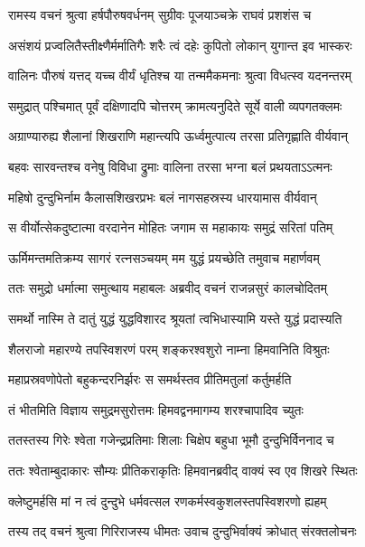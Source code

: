 
\twolineshloka
{रामस्य वचनं श्रुत्वा हर्षपौरुषवर्धनम्}
{सुग्रीवः पूजयाञ्चक्रे राघवं प्रशशंस च} %

\twolineshloka
{असंशयं प्रज्वलितैस्तीक्ष्णैर्मर्मातिगैः शरैः}
{त्वं दहेः कुपितो लोकान् युगान्त इव भास्करः} %

\twolineshloka
{वालिनः पौरुषं यत्तद् यच्च वीर्यं धृतिश्च या}
{तन्ममैकमनाः श्रुत्वा विधत्स्व यदनन्तरम्} %

\twolineshloka
{समुद्रात् पश्चिमात् पूर्वं दक्षिणादपि चोत्तरम्}
{क्रामत्यनुदिते सूर्ये वाली व्यपगतक्लमः} %

\twolineshloka
{अग्राण्यारुह्य शैलानां शिखराणि महान्त्यपि}
{ऊर्ध्वमुत्पात्य तरसा प्रतिगृह्णाति वीर्यवान्} %

\twolineshloka
{बहवः सारवन्तश्च वनेषु विविधा द्रुमाः}
{वालिना तरसा भग्ना बलं प्रथयताऽऽत्मनः} %

\twolineshloka
{महिषो दुन्दुभिर्नाम कैलासशिखरप्रभः}
{बलं नागसहस्रस्य धारयामास वीर्यवान्} %

\twolineshloka
{स वीर्योत्सेकदुष्टात्मा वरदानेन मोहितः}
{जगाम स महाकायः समुद्रं सरितां पतिम्} %

\twolineshloka
{ऊर्मिमन्तमतिक्रम्य सागरं रत्नसञ्चयम्}
{मम युद्धं प्रयच्छेति तमुवाच महार्णवम्} %

\twolineshloka
{ततः समुद्रो धर्मात्मा समुत्थाय महाबलः}
{अब्रवीद् वचनं राजन्नसुरं कालचोदितम्} %

\twolineshloka
{समर्थो नास्मि ते दातुं युद्धं युद्धविशारद}
{श्रूयतां त्वभिधास्यामि यस्ते युद्धं प्रदास्यति} %

\twolineshloka
{शैलराजो महारण्ये तपस्विशरणं परम्}
{शङ्करश्वशुरो नाम्ना हिमवानिति विश्रुतः} %

\twolineshloka
{महाप्रस्रवणोपेतो बहुकन्दरनिर्झरः}
{स समर्थस्तव प्रीतिमतुलां कर्तुमर्हति} %

\twolineshloka
{तं भीतमिति विज्ञाय समुद्रमसुरोत्तमः}
{हिमवद्वनमागम्य शरश्चापादिव च्युतः} %

\twolineshloka
{ततस्तस्य गिरेः श्वेता गजेन्द्रप्रतिमाः शिलाः}
{चिक्षेप बहुधा भूमौ दुन्दुभिर्विननाद च} %

\twolineshloka
{ततः श्वेताम्बुदाकारः सौम्यः प्रीतिकराकृतिः}
{हिमवानब्रवीद् वाक्यं स्व एव शिखरे स्थितः} %

\twolineshloka
{क्लेष्टुमर्हसि मां न त्वं दुन्दुभे धर्मवत्सल}
{रणकर्मस्वकुशलस्तपस्विशरणो ह्यहम्} %

\twolineshloka
{तस्य तद् वचनं श्रुत्वा गिरिराजस्य धीमतः}
{उवाच दुन्दुभिर्वाक्यं क्रोधात् संरक्तलोचनः} %

